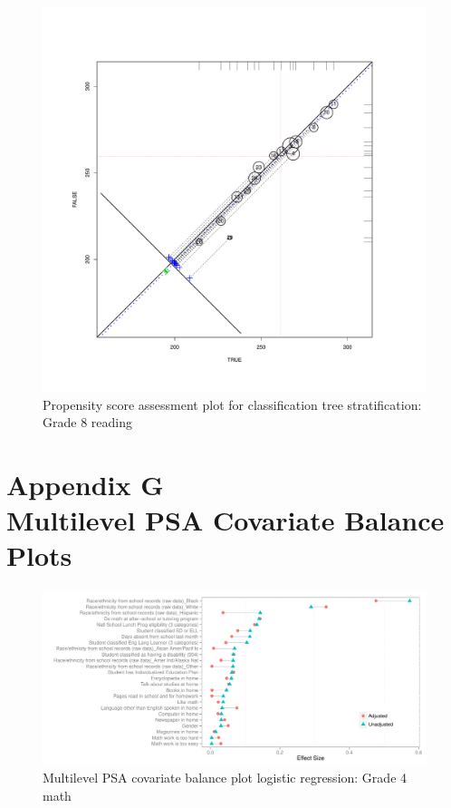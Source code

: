\clearpage
\begin{figure}
\begin{center}
\includegraphics[height=.4\textheight,width=.4\textheight]{../Figures2009/g8read-circpsa-tree.pdf}
\caption{Propensity score assessment plot for classification tree stratification: Grade 8 reading}
\end{center}
\end{figure}





\clearpage
{}
\section*{Appendix G\\Multilevel PSA Covariate Balance Plots}

\begin{figure}[h!]
\begin{center}
\includegraphics[width=\textwidth]{../Figures2009/g4math-mlpsa-lr-balance.pdf}
\caption{Multilevel PSA covariate balance plot logistic regression: Grade 4 math}
\end{center}
\end{figure}

